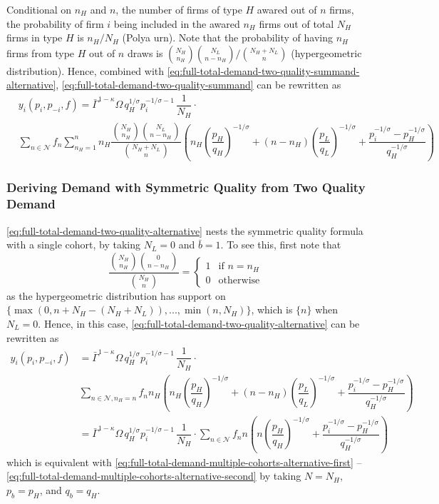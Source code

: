 \documentclass[12pt]{article}
\begin{document}
Conditional on $n_H$ and $n$, the number of firms of type $H$ awared out of $n$ firms, the probability of firm $i$ being included in the awared $n_H$ firms out of total $N_H$ firms in type $H$ is $n_H / N_H$ (Polya urn). Note that the probability of having $n_H$ firms from type $H$ out of $n$ draws is $\binom{N_H}{n_H} \binom{N_L}{n - n_H} / \binom{N_H + N_L}{n}$ (hypergeometric distribution). Hence, combined with \eqref{eq:full-total-demand-two-quality-summand-alternative},  \eqref{eq:full-total-demand-two-quality-summand} can be rewritten as
\begin{align}
& y_{i}(p_i, p_{-i}, f) 
=  \bar{\Gamma}^{1-\kappa}\Omega \, q_H^{1/\sigma}p_i^{-1/\sigma - 1}\, \dfrac{1}{N_H} \cdot \\ 
&\sum_{n \in \mathcal{N} } f_n   \sum_{n_H =1}^n  
n_H \dfrac{\binom{N_H}{n_H} \binom{N_L}{n - n_H}}{\binom{N_H + N_L}{n}}
\left( 
 n_H \left( \dfrac{p_{H}}{q_{H}}   \right)^{-1/\sigma} +  
(n - n_H) \left( \dfrac{p_{L}}{q_{L}}   \right)^{-1/\sigma} +
\dfrac{p_i^{-1/\sigma} - p^{-1/\sigma}_{H} }{ q_H^{-1/\sigma }} 
  \right)  
\label{eq:full-total-demand-two-quality-alternative}
\end{align}

\subsubsection{Deriving Demand with Symmetric Quality from Two Quality Demand}
\eqref{eq:full-total-demand-two-quality-alternative} nests the symmetric quality formula with a single cohort, by taking $N_L = 0$ and $\bar b = 1$. To see this, first note that
\begin{equation}
\dfrac{\binom{N_H}{n_H} \binom{0}{n - n_H}}{\binom{N_H}{n}} = 
\begin{cases}
1 & \text{if $n = n_H$} \\
0 & \text{otherwise} 
\end{cases}
\end{equation}
as the hypergeometric distribution has support on $\{\max(0, n+N_H - (N_H + N_L) ), ..., \min (n, N_H )  \}$, which is $\{n\}$ when $N_L = 0$. Hence, in this case, \eqref{eq:full-total-demand-two-quality-alternative} can be rewritten as
\begin{align}
 y_{i}(p_i, p_{-i}, f) 
&=  \bar{\Gamma}^{1-\kappa}\Omega \, q_H^{1/\sigma}p_i^{-1/\sigma - 1}\, \dfrac{1}{N_H} \cdot \\ 
&\sum_{n \in \mathcal{N}, n_H = n } f_{n}  
n_H 
\left( 
n_H \left( \dfrac{p_{H}}{q_{H}}   \right)^{-1/\sigma} +  
(n - n_H) \left( \dfrac{p_{L}}{q_{L}}   \right)^{-1/\sigma} +
\dfrac{p_i^{-1/\sigma} - p^{-1/\sigma}_{H} }{ q_H^{-1/\sigma }} 
\right)  \\
&=  \bar{\Gamma}^{1-\kappa}\Omega \, q_H^{1/\sigma}p_i^{-1/\sigma - 1}\, \dfrac{1}{N_H} \cdot \sum_{n \in \mathcal{N}} f_{n}  
n
\left( 
n \left( \dfrac{p_{H}}{q_{H}}   \right)^{-1/\sigma} +  
\dfrac{p_i^{-1/\sigma} - p^{-1/\sigma}_{H} }{ q_H^{-1/\sigma }} 
\right)  
\end{align}
which is equivalent with \eqref{eq:full-total-demand-multiple-cohorts-alternative-first} -- \eqref{eq:full-total-demand-multiple-cohorts-alternative-second} by taking $N = N_H$, $p_b = p_H$, and $q_b = q_H$.
\end{document}
